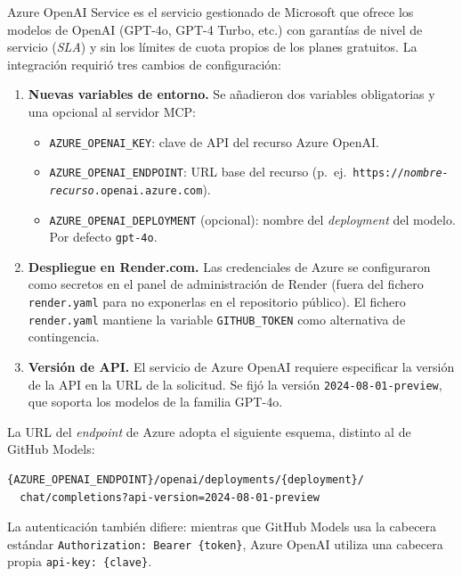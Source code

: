 Azure OpenAI Service es el servicio gestionado de Microsoft que ofrece los modelos de OpenAI (GPT-4o, GPT-4 Turbo, etc.) con garantías de nivel de servicio (\textit{SLA}) y sin los límites de cuota propios de los planes gratuitos. La integración requirió tres cambios de configuración:

\begin{enumerate}
  \item \textbf{Nuevas variables de entorno.} Se añadieron dos variables obligatorias y una opcional al servidor MCP:
  \begin{itemize}
    \item \texttt{AZURE\_OPENAI\_KEY}: clave de API del recurso Azure OpenAI.
    \item \texttt{AZURE\_OPENAI\_ENDPOINT}: URL base del recurso (p.~ej.\ \texttt{https://\textit{nombre-recurso}.openai.azure.com}).
    \item \texttt{AZURE\_OPENAI\_DEPLOYMENT} (opcional): nombre del \textit{deployment} del modelo. Por defecto \texttt{gpt-4o}.
  \end{itemize}

  \item \textbf{Despliegue en Render.com.} Las credenciales de Azure se configuraron como secretos en el panel de administración de Render (fuera del fichero \texttt{render.yaml} para no exponerlas en el repositorio público). El fichero \texttt{render.yaml} mantiene la variable \texttt{GITHUB\_TOKEN} como alternativa de contingencia.

  \item \textbf{Versión de API.} El servicio de Azure OpenAI requiere especificar la versión de la API en la URL de la solicitud. Se fijó la versión \texttt{2024-08-01-preview}, que soporta los modelos de la familia GPT-4o.
\end{enumerate}

La URL del \textit{endpoint} de Azure adopta el siguiente esquema, distinto al de GitHub Models:

\begin{lstlisting}[style=promptbox]
{AZURE_OPENAI_ENDPOINT}/openai/deployments/{deployment}/
  chat/completions?api-version=2024-08-01-preview
\end{lstlisting}

La autenticación también difiere: mientras que GitHub Models usa la cabecera estándar \texttt{Authorization: Bearer \{token\}}, Azure OpenAI utiliza una cabecera propia \texttt{api-key: \{clave\}}.

